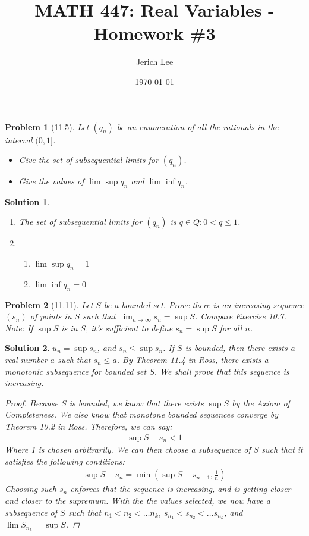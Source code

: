 \documentclass[12pt]{article}
\title{MATH 447: Real Variables - Homework \#3}
\author{Jerich Lee}
\date{\today}
\newtheorem{problem}{Problem}
\newtheorem{solution}{Solution}
\begin{document}
\maketitle

\begin{problem}[11.5]
Let $(q_n)$ be an enumeration of all the rationals in the interval $(0,1]$.
\begin{itemize}
    \item Give the set of subsequential limits for $(q_n)$.
    \item Give the values of $\lim \sup q_n$ and $\lim \inf q_n$. 
\end{itemize}
\end{problem}
\begin{solution}
    \begin{enumerate}      
  \item The set of subsequential limits for $(q_{n} )$ is ${q \in Q : 0 < q \leq 1}$. 
  \item  \begin{enumerate}
 \item $\lim \sup q_{n} =1$   
 \item $\lim \inf q_{n} = 0$ 
  \end{enumerate}    
   \end{enumerate}
\end{solution}

\begin{problem}[11.11]
    Let $S$ be a bounded set. Prove there is an increasing sequence $(s_n)$ of points in $S$ such that $\lim_{n \to \infty} s_n=\sup S$. Compare Exercise 10.7. Note: If $\sup S$ is in $S$, it's sufficient to define $s_n=\sup S$ for all $n$.  
\end{problem}

\begin{solution}
$u_{n} =\sup s_{n} $, and $s_{n} \leq \sup s_{n} $. If $S$ is bounded, then there exists a real number $a$ such that $s_{n} \leq a$. By Theorem 11.4 in Ross, there exists a monotonic subsequence for bounded set $S$. We shall prove that this sequence is increasing.
\begin{proof}
    Because $S$ is bounded, we know that there exists $\sup S$ by the Axiom of Completeness. We also know that monotone bounded sequences converge by Theorem 10.2 in Ross. Therefore, we can say:
    \begin{align}
        \sup S-s_{n} <1
    \end{align}
    Where 1 is chosen arbitrarily. We can then choose a subsequence of $S$ such that it satisfies the following conditions:
    \begin{align}
        \sup S - s_n = \min \left( \sup S - s_{n-1}, \frac{1}{n} \right)
    \end{align}
    Choosing such $s_{n} $ enforces that the sequence is increasing, and is getting closer and closer to the supremum. With the the values selected, we now have a subsequence of $S$ such that $n_1<n_{2}<\ldots n_k $, $s_{n_1}<s_{n_2}<\ldots s_{n_k}$, and $\lim S_{n_k} = \sup S$.  
\end{proof} 
\end{solution}
\end{document}
